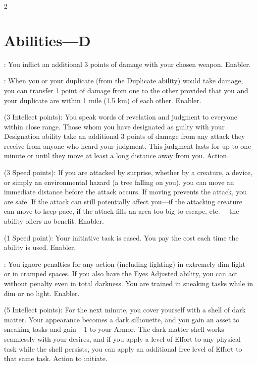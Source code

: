 \begin{multicols}{2}

\section{Abilities—D}

: You inflict an additional 3 points of damage with your chosen weapon. Enabler. 

: When you or your duplicate (from the Duplicate ability) would take damage, you can transfer 1 point of damage from one to the other provided that you and your duplicate are within 1 mile (1.5 km) of each other. Enabler. 

 (3 Intellect points): You speak words of revelation and judgment to everyone within close range. Those whom you have designated as guilty with your Designation ability take an additional 3 points of damage from any attack they receive from anyone who heard your judgment. This judgment lasts for up to one minute or until they move at least a long distance away from you. Action. 

 (3 Speed points): If you are attacked by surprise, whether by a creature, a device, or simply an environmental hazard (a tree falling on you), you can move an immediate distance before the attack occurs. If moving prevents the attack, you are safe. If the attack can still potentially affect you—if the attacking creature can move to keep pace, if the attack fills an area too big to escape, etc. —the ability offers no benefit. Enabler. 

 (1 Speed point): Your initiative task is eased. You pay the cost each time the ability is used. Enabler.

: You ignore penalties for any action (including fighting) in extremely dim light or in cramped spaces. If you also have the Eyes Adjusted ability, you can act without penalty even in total darkness. You are trained in sneaking tasks while in dim or no light. Enabler. 

 (5 Intellect points): For the next minute, you cover yourself with a shell of dark matter. Your appearance becomes a dark silhouette, and you gain an asset to sneaking tasks and gain +1 to your Armor. The dark matter shell works seamlessly with your desires, and if you apply a level of Effort to any physical task while the shell persists, you can apply an additional free level of Effort to that same task. Action to initiate. 


\end{multicols}
